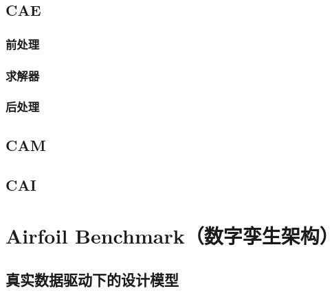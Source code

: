 \documentclass[letterpaper,10pt,english]{sphinxmanual}
\begin{document}
\subsection{CAE}
\label{\detokenize{src/fengsim/cae:cae}}\label{\detokenize{src/fengsim/cae::doc}}
\sphinxstepscope


\subsubsection{前处理}
\label{\detokenize{src/fengsim/cae_pre:id1}}\label{\detokenize{src/fengsim/cae_pre::doc}}
\sphinxstepscope


\subsubsection{求解器}
\label{\detokenize{src/fengsim/cae_solver:id1}}\label{\detokenize{src/fengsim/cae_solver::doc}}
\sphinxstepscope


\subsubsection{后处理}
\label{\detokenize{src/fengsim/cae_post:id1}}\label{\detokenize{src/fengsim/cae_post::doc}}
\sphinxstepscope


\subsection{CAM}
\label{\detokenize{src/fengsim/cam:cam}}\label{\detokenize{src/fengsim/cam::doc}}
\sphinxstepscope


\subsection{CAI}
\label{\detokenize{src/fengsim/cai:cai}}\label{\detokenize{src/fengsim/cai::doc}}
\sphinxstepscope


\section{Airfoil Benchmark（数字孪生架构）}
\label{\detokenize{src/fengsim/airfoil:airfoil-benchmark}}\label{\detokenize{src/fengsim/airfoil::doc}}
\sphinxstepscope


\subsection{真实数据驱动下的设计模型}
\label{\detokenize{src/fengsim/dt:id1}}\label{\detokenize{src/fengsim/dt::doc}}
\end{document}
